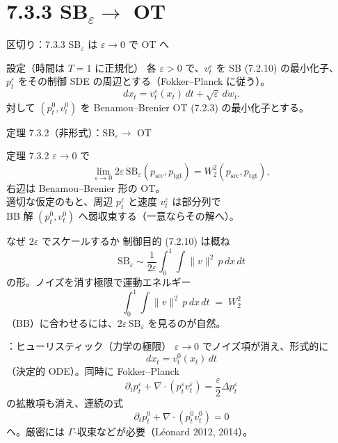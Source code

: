 \section{7.3.3 SB$_\varepsilon\to$ OT}
\asmain
\begin{frame}{区切り：7.3.3 SB$_\varepsilon$ は $\varepsilon\to 0$ で OT へ}
    \tableofcontents[currentsection]
\end{frame}
\asmain
\begin{frame}{設定（時間は $T=1$ に正規化）}
    各 $\varepsilon>0$ で、$v_t^\varepsilon$ を SB (7.2.10) の最小化子、\\
    $p_t^\varepsilon$ をその制御 SDE の周辺とする（Fokker--Planck に従う）。
    \[
        dx_t
        =
        v_t^\varepsilon(x_t)\,dt
        +
        \sqrt{\varepsilon}\,dw_t.
    \]
    対して $(p_t^0,v_t^0)$ を Benamou--Brenier OT (7.2.3) の最小化子とする。
\end{frame}
\asmain
\begin{frame}{定理 7.3.2（非形式）：SB$_\varepsilon\to$ OT}
    \begin{block}{定理 7.3.2}
        $\varepsilon\to 0$ で
        \[
            \lim_{\varepsilon\to 0}
            2\varepsilon\,\mathrm{SB}_\varepsilon(p_{\mathrm{src}},p_{\mathrm{tgt}})
            =
            W_2^2(p_{\mathrm{src}},p_{\mathrm{tgt}}),
        \]
        右辺は Benamou--Brenier 形の OT。\\
        適切な仮定のもと、周辺 $p_t^\varepsilon$ と速度 $v_t^\varepsilon$ は部分列で\\
        BB 解 $(p_t^0,v_t^0)$ へ弱収束する（一意ならその解へ）。
    \end{block}
\end{frame}
\asmain
\begin{frame}{なぜ $2\varepsilon$ でスケールするか}
    制御目的 (7.2.10) は概ね
    \[
        \mathrm{SB}_\varepsilon
        \sim
        \frac{1}{2\varepsilon}
        \int_0^1\!\!\int \|v\|^2\,p\,dx\,dt
    \]
    の形。ノイズを消す極限で運動エネルギー
    \[
        \int_0^1\!\!\int \|v\|^2\,p\,dx\,dt
        \;=\;
        W_2^2
    \]
    （BB）に合わせるには、$2\varepsilon\,\mathrm{SB}_\varepsilon$ を見るのが自然。
\end{frame}
\assuppl
\begin{frame}{\supplmark：ヒューリスティック（力学の極限）}
    $\varepsilon\to 0$ でノイズ項が消え、形式的に
    \[
        dx_t=v_t^0(x_t)\,dt
    \]
    （決定的 ODE）。同時に Fokker--Planck
    \[
        \partial_t p_t^\varepsilon
        +
        \nabla\cdot(p_t^\varepsilon v_t^\varepsilon)
        =
        \frac{\varepsilon}{2}\Delta p_t^\varepsilon
    \]
    の拡散項も消え、連続の式
    \[
        \partial_t p_t^0+\nabla\cdot(p_t^0 v_t^0)=0
    \]
    へ。厳密には $\Gamma$-収束などが必要（Léonard 2012, 2014）。
\end{frame}

